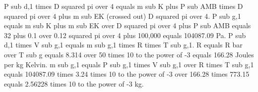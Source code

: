 P sub d,1 times D squared pi over 4 equals m sub K plus P sub AMB times D squared pi over 4 plus m sub EK (crossed out) D squared pi over 4.  
P sub g,1 equals m sub K plus m sub EK over D squared pi over 4 plus P sub AMB equals 32 plus 0.1 over 0.12 squared pi over 4 plus 100,000 equals 104087.09 Pa.  
P sub d,1 times V sub g,1 equals m sub g,1 times R times T sub g,1.  
R equals R bar over T sub g equals 8.314 over 50 times 10 to the power of -3 equals 166.28 Joules per kg Kelvin.  
m sub g,1 equals P sub g,1 times V sub g,1 over R times T sub g,1 equals 104087.09 times 3.24 times 10 to the power of -3 over 166.28 times 773.15 equals 2.56228 times 10 to the power of -3 kg.